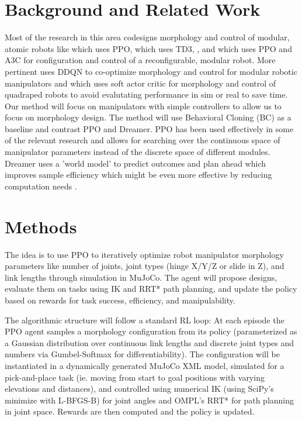 \documentclass[conference]{IEEEtran}
\begin{document}
\section{Background and Related Work}
Most of the research in this area codesigns morphology and control of modular, atomic robots like \cite{bhatia2023reinforcement} which uses PPO, \cite{tjanaka2023co} which uses TD3, \cite{spielberg2025accelerated}, and \cite{kalimuthu2023} which uses PPO and A3C for configuration and control of a reconfigurable, modular robot.
More pertinent \cite{ding2024modular} uses DDQN to co-optimize morphology and control for modular robotic manipulators and \cite{luck2019data} which uses soft actor critic for morphology and control of quadraped robots to avoid evalutating performance in sim or real to save time.
Our method will focus on manipulators with simple controllers to allow us to focus on morphology design.
The method will use Behavioral Cloning (BC) as a baseline and contrast PPO and Dreamer.
PPO has been used effectively in some of the relevant research and allows for searching over the continuous space of manipulator parameters instead of the discrete space of different modules.
Dreamer uses a 'world model' to predict outcomes and plan ahead which improves sample efficiency which might be even more effective by reducing computation needs \cite{hafner2019dream}.

\section{Methods}
The idea is to use PPO to iteratively optimize robot manipulator morphology parameters like number of joints, joint types (hinge X/Y/Z or slide in Z), and link lengths through simulation in MuJoCo.
The agent will propose designs, evaluate them on tasks using IK and RRT* path planning, and update the policy based on rewards for task success, efficiency, and manipulability.

The algorithmic structure will follow a standard RL loop: At each episode the PPO agent samples a morphology configuration from its policy (parameterized as a Gaussian distribution over continuous link lengths and discrete joint types and numbers via Gumbel-Softmax for differentiability).
The configuration will be instantiated in a dynamically generated MuJoCo XML model, simulated for a pick-and-place task (ie. moving from start to goal positions with varying elevations and distances), and controlled using numerical IK (using SciPy's minimize with L-BFGS-B) for joint angles and OMPL's RRT* for path planning in joint space.
Rewards are then computed and the policy is updated.
\end{document}
